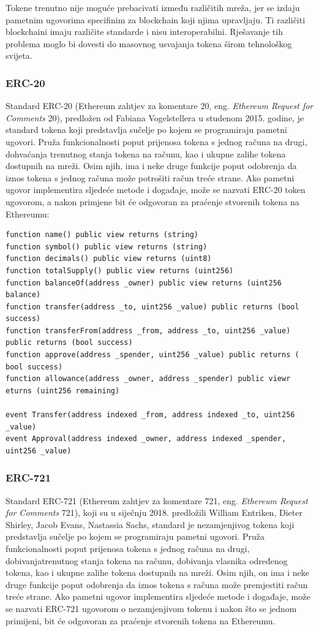 \documentclass[times, utf8, diplomski]{fer}
\begin{document}
Tokene trenutno nije moguće prebacivati između različitih mreža, jer se izdaju pametnim ugovorima specifinim za blockchain koji njima upravljaju. Ti različiti blockchaini imaju različite standarde i nisu interoperabilni. Rješavanje tih problema moglo bi dovesti do masovnog usvajanja tokena širom tehnološkog svijeta.
\subsubsection{ERC-20}

Standard ERC-20 (Ethereum zahtjev za komentare 20,  eng.  \textit{Ethereum Request for Comments} 20), predložen od  Fabiana Vogelstellera u studenom 2015. godine, je standard tokena koji predstavlja sučelje po kojem se programiraju pametni ugovori. Pruža funkcionalnosti poput prijenosa tokena s jednog računa na drugi, dohvaćanja trenutnog stanja tokena na računu, kao i ukupne zalihe tokena dostupnih na mreži. Osim njih, ima i neke druge funkcije poput odobrenja da iznos tokena s jednog računa može potrošiti račun treće strane. Ako pametni ugovor implementira sljedeće metode i događaje, može se nazvati ERC-20 token ugovorom, a nakon primjene bit će odgovoran za praćenje stvorenih
tokena na Ethereumu:

\begin{lstlisting}
function name() public view returns (string)
function symbol() public view returns (string)
function decimals() public view returns (uint8)
function totalSupply() public view returns (uint256)
function balanceOf(address _owner) public view returns (uint256 balance)
function transfer(address _to, uint256 _value) public returns (bool success)
function transferFrom(address _from, address _to, uint256 _value) public returns (bool success)
function approve(address _spender, uint256 _value) public returns ( bool success)
function allowance(address _owner, address _spender) public viewr eturns (uint256 remaining)

event Transfer(address indexed _from, address indexed _to, uint256 _value)
event Approval(address indexed _owner, address indexed _spender,  uint256 _value)
\end{lstlisting}

\subsubsection{ERC-721}

Standard ERC-721 (Ethereum zahtjev za komentare 721, eng. \textit{Ethereum Request for Comments} 721), koji su u siječnju 2018. predložili William Entriken, Dieter Shirley, Jacob Evans, Nastassia Sachs, standard je nezamjenjivog tokena koji predstavlja sučelje po kojem se programiraju pametni ugovori. Pruža funkcionalnosti poput prijenosa tokena s jednog računa na drugi, dobivanjatrenutnog stanja tokena na računu, dobivanja vlasnika određenog tokena, kao i ukupne zalihe tokena dostupnih na mreži. Osim njih, on ima i neke druge funkcije poput odobrenja da iznos tokena s računa može premjestiti račun treće strane.
Ako pametni ugovor implementira sljedeće metode i događaje, može se nazvati ERC-721 ugovorom o nezamjenjivom tokenu i nakon što se jednom primijeni, bit će odgovoran za praćenje stvorenih tokena na Ethereumu.
\end{document}
